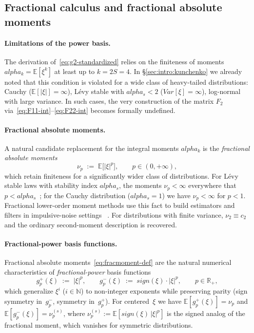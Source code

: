 \documentclass[11pt]{article}
\def\alpha{alpha}%
\def\mathbf#1{#1}%
\def\mathrm#1{#1}%
\theoremstyle{definition}
\newcommand{\E}{\mathbb{E}}
\newcommand{\Var}{\mathrm{Var}}
\begin{document}
\subsection{Fractional calculus and fractional absolute moments}\label{sec:bg:fracmoments}

\paragraph{Limitations of the power basis.}
The derivation of~\eqref{eq:g2-standardized} relies on the finiteness of
moments $\alpha_k = \E[\xi^k]$ at least up to $k = 2S = 4$. In
\S\ref{sec:intro:kunchenko} we already noted that this condition is violated
for a wide class of heavy-tailed distributions: Cauchy ($\E[|\xi|] = \infty$),
Lévy stable with $\alpha_s < 2$ ($\Var[\xi] = \infty$), log-normal with
large variance. In such cases, the very construction of the matrix
$\mathbf{F}_2$ via~\eqref{eq:F11-int}--\eqref{eq:F22-int} becomes formally
undefined.

\paragraph{Fractional absolute moments.}
A natural candidate replacement for the integral moments $\alpha_k$ is the
\emph{fractional absolute moments}
\begin{equation}\label{eq:fracmoment-def}
  \nu_p \;:=\; \E\bigl[|\xi|^p\bigr], \qquad p \in (0, +\infty),
\end{equation}
which retain finiteness for a significantly wider class of distributions.
For Lévy stable laws with stability index $\alpha_s$, the moments
$\nu_p < \infty$ everywhere that $p < \alpha_s$~\citep{nolan2020stable};
for the Cauchy distribution ($\alpha_s = 1$) we have $\nu_p < \infty$ for
$p < 1$. Fractional lower-order moment methods use this fact to build
estimators and filters in impulsive-noise settings
~\citep{shao1993signal,matsui2013fracmoments}. For distributions with finite
variance, $\nu_2 \equiv c_2$ and the ordinary second-moment description is
recovered.

\paragraph{Fractional-power basis functions.}
Fractional absolute moments~\eqref{eq:fracmoment-def} are the natural
numerical characteristics of \emph{fractional-power} basis functions
\begin{equation}\label{eq:gp-def}
  g_p^{+}(\xi) \;:=\; |\xi|^{p}, \qquad
  g_p^{-}(\xi) \;:=\; \mathrm{sign}(\xi) \cdot |\xi|^{p},
  \qquad p \in \mathbb{R}_{+},
\end{equation}
which generalize $\xi^i$ ($i \in \mathbb{N}$) to non-integer exponents
while preserving parity (sign symmetry in~$g_p^{-}$, symmetry in~$g_p^{+}$).
For centered~$\xi$ we have $\E[g_p^{+}(\xi)] = \nu_p$ and
$\E[g_p^{-}(\xi)] = \nu_p^{(s)}$, where
$\nu_p^{(s)} := \E[\mathrm{sign}(\xi)\,|\xi|^p]$ is the signed analog of
the fractional moment, which vanishes for symmetric distributions.
\end{document}
